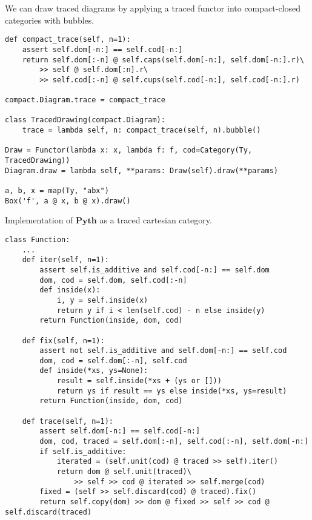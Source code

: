 \begin{example}
We can draw traced diagrams by applying a traced functor into compact-closed categories with bubbles.

\begin{verbatim}
def compact_trace(self, n=1):
    assert self.dom[-n:] == self.cod[-n:]
    return self.dom[:-n] @ self.caps(self.dom[-n:], self.dom[-n:].r)\
        >> self @ self.dom[:n].r\
        >> self.cod[:-n] @ self.cups(self.cod[-n:], self.cod[-n:].r)

compact.Diagram.trace = compact_trace

class TracedDrawing(compact.Diagram):
    trace = lambda self, n: compact_trace(self, n).bubble()

Draw = Functor(lambda x: x, lambda f: f, cod=Category(Ty, TracedDrawing))
Diagram.draw = lambda self, **params: Draw(self).draw(**params)

a, b, x = map(Ty, "abx")
Box('f', a @ x, b @ x).draw()
\end{verbatim}
\end{example}

\begin{python}\label{listing:traced-python}
{\normalfont Implementation of $\mathbf{Pyth}$ as a traced cartesian category.}

\begin{verbatim}
class Function:
    ...
    def iter(self, n=1):
        assert self.is_additive and self.cod[-n:] == self.dom
        dom, cod = self.dom, self.cod[:-n]
        def inside(x):
            i, y = self.inside(x)
            return y if i < len(self.cod) - n else inside(y)
        return Function(inside, dom, cod)

    def fix(self, n=1):
        assert not self.is_additive and self.dom[-n:] == self.cod
        dom, cod = self.dom[:-n], self.cod
        def inside(*xs, ys=None):
            result = self.inside(*xs + (ys or []))
            return ys if result == ys else inside(*xs, ys=result)
        return Function(inside, dom, cod)

    def trace(self, n=1):
        assert self.dom[-n:] == self.cod[-n:]
        dom, cod, traced = self.dom[:-n], self.cod[:-n], self.dom[-n:]
        if self.is_additive:
            iterated = (self.unit(cod) @ traced >> self).iter()
            return dom @ self.unit(traced)\
                >> self >> cod @ iterated >> self.merge(cod)
        fixed = (self >> self.discard(cod) @ traced).fix()
        return self.copy(dom) >> dom @ fixed >> self >> cod @ self.discard(traced)
\end{verbatim}
\end{python}

